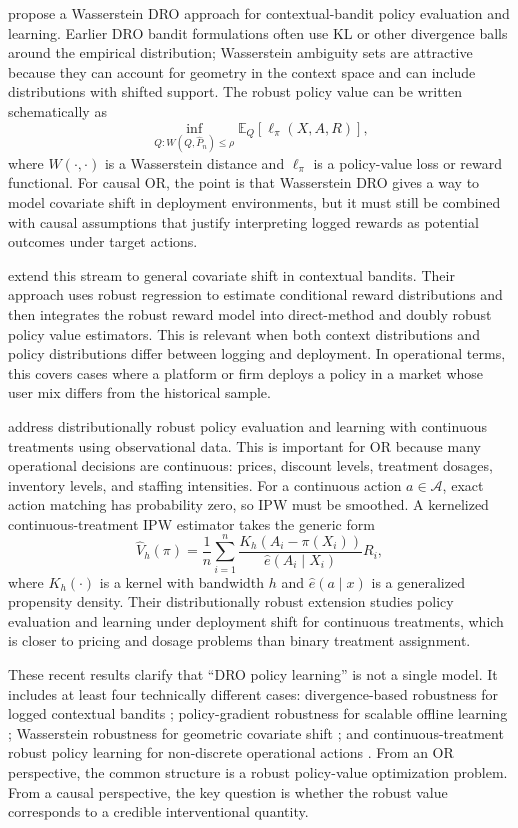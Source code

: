 \documentclass[11pt]{article}
\begin{document}
\citet{shen2023wasserstein} propose a Wasserstein DRO approach for contextual-bandit policy evaluation and learning. Earlier DRO bandit formulations often use KL or other divergence balls around the empirical distribution; Wasserstein ambiguity sets are attractive because they can account for geometry in the context space and can include distributions with shifted support. The robust policy value can be written schematically as
\[
    \inf_{Q: W(Q,\widehat{P}_n)\le \rho}
    \mathbb{E}_{Q}\left[\ell_{\pi}(X,A,R)\right],
\]
where $W(\cdot,\cdot)$ is a Wasserstein distance and $\ell_{\pi}$ is a policy-value loss or reward functional. For causal OR, the point is that Wasserstein DRO gives a way to model covariate shift in deployment environments, but it must still be combined with causal assumptions that justify interpreting logged rewards as potential outcomes under target actions.

\citet{guo2024covariate} extend this stream to general covariate shift in contextual bandits. Their approach uses robust regression to estimate conditional reward distributions and then integrates the robust reward model into direct-method and doubly robust policy value estimators. This is relevant when both context distributions and policy distributions differ between logging and deployment. In operational terms, this covers cases where a platform or firm deploys a policy in a market whose user mix differs from the historical sample.

\citet{leung2025continuous} address distributionally robust policy evaluation and learning with continuous treatments using observational data. This is important for OR because many operational decisions are continuous: prices, discount levels, treatment dosages, inventory levels, and staffing intensities. For a continuous action $a\in\mathcal{A}$, exact action matching has probability zero, so IPW must be smoothed. A kernelized continuous-treatment IPW estimator takes the generic form
\[
    \widehat{V}_{h}(\pi)
    =
    \frac{1}{n}\sum_{i=1}^{n}
    \frac{K_h(A_i-\pi(X_i))}{\hat{e}(A_i\mid X_i)}R_i,
\]
where $K_h(\cdot)$ is a kernel with bandwidth $h$ and $\hat{e}(a\mid x)$ is a generalized propensity density. Their distributionally robust extension studies policy evaluation and learning under deployment shift for continuous treatments, which is closer to pricing and dosage problems than binary treatment assignment.

These recent results clarify that ``DRO policy learning'' is not a single model. It includes at least four technically different cases: divergence-based robustness for logged contextual bandits \citep{si2020dro}; policy-gradient robustness for scalable offline learning \citep{yang2023dropo}; Wasserstein robustness for geometric covariate shift \citep{shen2023wasserstein}; and continuous-treatment robust policy learning for non-discrete operational actions \citep{leung2025continuous}. From an OR perspective, the common structure is a robust policy-value optimization problem. From a causal perspective, the key question is whether the robust value corresponds to a credible interventional quantity.
\end{document}

